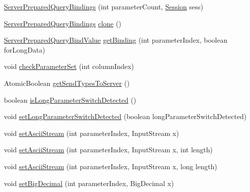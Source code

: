 \begin{DoxyCompactItemize}
\item 
\mbox{\hyperlink{classcom_1_1mysql_1_1cj_1_1_server_prepared_query_bindings_ab65a68783b4405e29b56c86ba0f58d30}{Server\+Prepared\+Query\+Bindings}} (int parameter\+Count, \mbox{\hyperlink{interfacecom_1_1mysql_1_1cj_1_1_session}{Session}} sess)
\item 
\mbox{\hyperlink{classcom_1_1mysql_1_1cj_1_1_server_prepared_query_bindings}{Server\+Prepared\+Query\+Bindings}} \mbox{\hyperlink{classcom_1_1mysql_1_1cj_1_1_server_prepared_query_bindings_a846a05c42a42c694efa17b4320d5b428}{clone}} ()
\item 
\mbox{\hyperlink{classcom_1_1mysql_1_1cj_1_1_server_prepared_query_bind_value}{Server\+Prepared\+Query\+Bind\+Value}} \mbox{\hyperlink{classcom_1_1mysql_1_1cj_1_1_server_prepared_query_bindings_a15f0b3974435b3e95fcbbe4a050fb5d6}{get\+Binding}} (int parameter\+Index, boolean for\+Long\+Data)
\item 
void \mbox{\hyperlink{classcom_1_1mysql_1_1cj_1_1_server_prepared_query_bindings_a2fe01e3785026b382a42326560cf3ea9}{check\+Parameter\+Set}} (int column\+Index)
\item 
Atomic\+Boolean \mbox{\hyperlink{classcom_1_1mysql_1_1cj_1_1_server_prepared_query_bindings_ae8828a315e21c8947dc86d0ef3868f89}{get\+Send\+Types\+To\+Server}} ()
\item 
boolean \mbox{\hyperlink{classcom_1_1mysql_1_1cj_1_1_server_prepared_query_bindings_a042277eb60cfb95149365faf474b5188}{is\+Long\+Parameter\+Switch\+Detected}} ()
\item 
void \mbox{\hyperlink{classcom_1_1mysql_1_1cj_1_1_server_prepared_query_bindings_a3fabbd97aff480c661dcf94c166ef0fa}{set\+Long\+Parameter\+Switch\+Detected}} (boolean long\+Parameter\+Switch\+Detected)
\item 
void \mbox{\hyperlink{classcom_1_1mysql_1_1cj_1_1_server_prepared_query_bindings_abaa9240c510b15134f50869c2d0b1d72}{set\+Ascii\+Stream}} (int parameter\+Index, Input\+Stream x)
\item 
void \mbox{\hyperlink{classcom_1_1mysql_1_1cj_1_1_server_prepared_query_bindings_a97f2e32edbc3ed6d41828e4a4a64d254}{set\+Ascii\+Stream}} (int parameter\+Index, Input\+Stream x, int length)
\item 
void \mbox{\hyperlink{classcom_1_1mysql_1_1cj_1_1_server_prepared_query_bindings_a2d986bf9be7f32708e2e4865072d9d15}{set\+Ascii\+Stream}} (int parameter\+Index, Input\+Stream x, long length)
\item 
void \mbox{\hyperlink{classcom_1_1mysql_1_1cj_1_1_server_prepared_query_bindings_abd26c15490cfb64143c3422cb30bfccc}{set\+Big\+Decimal}} (int parameter\+Index, Big\+Decimal x)

\end{DoxyCompactItemize}
